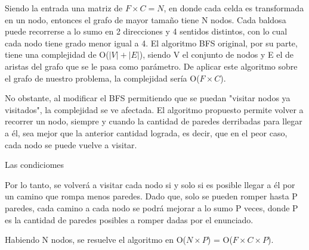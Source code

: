 Siendo la entrada una matriz de $F \times C = N$, en donde cada celda es transformada en un nodo, entonces el grafo de mayor tamaño tiene N nodos. Cada baldosa puede recorrerse a lo sumo en 2 direcciones y 4 sentidos distintos, con lo cual cada nodo tiene grado menor igual a 4. El algoritmo BFS original, por su parte, tiene una complejidad de O($|V|+|E|$), siendo V el conjunto de nodos y E el de aristas del grafo que se le pasa como parámetro. De aplicar este algoritmo sobre el grafo de nuestro problema, la complejidad sería O($F \times C$).

No obstante, al modificar el BFS permitiendo que se puedan "visitar nodos ya visitados", la complejidad se ve afectada. El algoritmo propuesto permite volver a recorrer un nodo, siempre y cuando la cantidad de paredes derribadas para llegar a él, sea mejor que la anterior cantidad lograda, es decir, que en el peor caso, cada nodo se puede vuelve a visitar.

Las condiciomes

Por lo tanto, se volver\'a a visitar cada nodo si y solo si es posible llegar a él por un camino que rompa menos paredes. Dado que, solo se pueden romper hasta P paredes, cada camino a cada nodo se podr\'a mejorar a lo sumo P veces, donde P es la cantidad de paredes posibles a romper dadas por el enunciado.











 Habiendo N nodos, se resuelve el algoritmo en O($N \times P$) = O($F \times C \times P$).